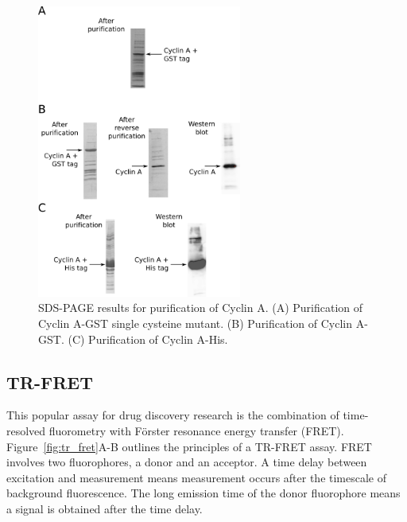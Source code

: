 \begin{figure}
\centering

\includegraphics[width=0.6\textwidth]{figures/purification/purification}

\caption{SDS-PAGE results for purification of Cyclin A.
(A) Purification of Cyclin A-GST single cysteine mutant.
(B) Purification of Cyclin A-GST.
(C) Purification of Cyclin A-His.}

\label{fig:purification}
\end{figure}


\subsection{TR-FRET}

This popular assay for drug discovery research is the combination of time-resolved fluorometry with F\"{o}rster resonance energy transfer (FRET).
Figure~\ref{fig:tr_fret}A-B outlines the principles of a TR-FRET assay.
FRET involves two fluorophores, a donor and an acceptor.
A time delay between excitation and measurement means measurement occurs after the timescale of background fluorescence.
The long emission time of the donor fluorophore means a signal is obtained after the time delay.


